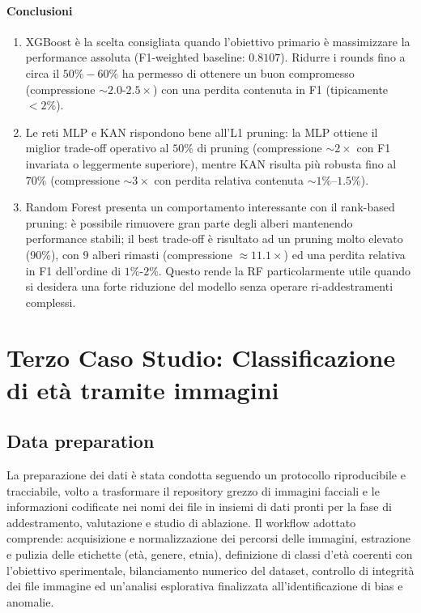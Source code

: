 \documentclass[a4paper,12pt]{report}
\begin{document}
	\subsubsection{Conclusioni}
	\begin{enumerate}
		\item XGBoost è la scelta consigliata quando l'obiettivo primario è massimizzare la performance assoluta (F1-weighted baseline: $0.8107$). Ridurre i rounds fino a circa il $50\%-60\%$ ha permesso di ottenere un buon compromesso (compressione $\sim 2.0$-$2.5\times$) con una perdita contenuta in F1 (tipicamente $<2\%$).
		\item Le reti MLP e KAN rispondono bene all'L1 pruning: la MLP ottiene il miglior trade-off operativo al $50\%$ di pruning (compressione $\sim 2\times$ con F1 invariata o leggermente superiore), mentre KAN risulta più robusta fino al $70\%$ (compressione $\sim 3\times$ con perdita relativa contenuta $\sim 1\%$--$1.5\%$).
		\item Random Forest presenta un comportamento interessante con il rank-based pruning: è possibile rimuovere gran parte degli alberi mantenendo performance stabili; il best trade-off è risultato ad un pruning molto elevato (90\%), con 9 alberi rimasti (compressione $\approx 11.1\times$) ed una perdita relativa in F1 dell'ordine di $1\%$-$2\%$. Questo rende la RF particolarmente utile quando si desidera una forte riduzione del modello senza operare ri-addestramenti complessi.
	\end{enumerate}
	
	\chapter{Terzo Caso Studio: Classificazione di età tramite immagini}
	
	\section{Data preparation}
	
	La preparazione dei dati è stata condotta seguendo un protocollo riproducibile e tracciabile, volto a trasformare il repository grezzo di immagini facciali e le informazioni codificate nei nomi dei file in insiemi di dati pronti per la fase di addestramento, valutazione e studio di ablazione. Il workflow adottato comprende: acquisizione e normalizzazione dei percorsi delle immagini, estrazione e pulizia delle etichette (età, genere, etnia), definizione di classi d'età coerenti con l'obiettivo sperimentale, bilanciamento numerico del dataset, controllo di integrità dei file immagine ed un'analisi esplorativa finalizzata all'identificazione di bias e anomalie.
	
\end{document}
